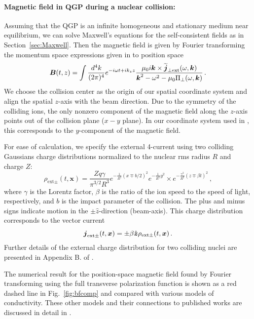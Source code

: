 \paragraph{Magnetic field in QGP during a nuclear collision:}\label{sec:Maxwell2} Assuming that the QGP is an infinite homogeneous and stationary medium near equilibrium, we can solve Maxwell's equations for the self-consistent fields as in Section~\ref{sec:Maxwell}. Then the magnetic field is given by Fourier transforming the momentum space expressions given in  to position space
\begin{equation}\label{eq:magorgin}
   \boldsymbol{B}(t, z) = \int \frac{d^4k}{(2\pi)^4}  e^{-i\omega t+ik_z z}
 \frac{\mu_0 i \boldsymbol{k} \times\widetilde{\boldsymbol{j}}_{\perp \text{ext}}(\omega, \boldsymbol{k})}{\boldsymbol{k}^2 - \omega^2 - \mu_0 \Pi_{\perp}(\omega, \boldsymbol{k})}\,.
\end{equation}
We choose the collision center as the origin of our spatial coordinate system and align the spatial $z$-axis with the beam direction. Due to the symmetry of the colliding ions, the only nonzero component of the magnetic field along the $z$-axis points out of the collision plane ($x-y$ plane). In our coordinate system used in \cite{Grayson:2022asf}, this corresponds to the $y$-component of the magnetic field. 

For ease of calculation, we specify the external 4-current using two colliding Gaussians charge distributions normalized to the nuclear rms radius $R$ and charge $Z$:
\begin{equation}\label{eq:rhoext}
\rho_{\text{ext}\pm }(t,\boldsymbol{x}) = \frac{Zq\gamma}{\pi^{3/2}R^3}e^{-\frac{1}{R^2}(x\mp b/2)^2}e^{-\frac{1}{R^2}y^2}
\times e^{-\frac{\gamma^2}{R^2}(z\mp \beta t)^2}\,,
\end{equation}
where $\gamma$ is the Lorentz factor, $\beta$ is the ratio of the ion speed to the speed of light, respectively, and $b$ is the impact parameter of the collision. The plus and minus signs indicate motion in the $\pm \hat{z}$-direction (beam-axis). This charge distribution corresponds to the vector current
\begin{equation}\label{eq:jext}
\boldsymbol{j}_{\text{ext}\pm}(t, \boldsymbol{x}) = \pm \beta \hat{\boldsymbol{z}} \rho_{\text{ext}\pm}(t, \boldsymbol{x})\,.
\end{equation}
Further details of the external charge distribution for two colliding nuclei are presented in Appendix B. of \cite{Grayson:2022asf}.

The numerical result for the position-space magnetic field found by Fourier transforming  using the full transverse polarization function  is shown as a red dashed line in Fig.~\ref{fig:bfcomp} and compared with various models of conductivity. These other models and their connections to published works are discussed in detail in \cite{Grayson:2022asf}.

